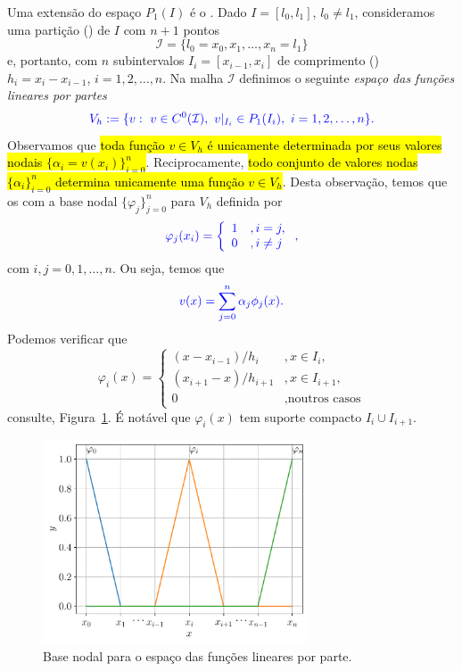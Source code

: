 Uma extensão do espaço $P_1(I)$ é o . Dado $I = [l_0, l_1]$, $l_0\neq l_1$, consideramos uma partição () de $I$ com $n+1$ pontos
\begin{equation}
  \mathcal{I} = \{l_0=x_0, x_1, \dotsc, x_n=l_1\}
\end{equation}
e, portanto, com $n$ subintervalos $I_i=[x_{i-1}, x_{i}]$ de comprimento () $h_i = x_i-x_{i-1}$, $i=1, 2, \dotsc, n$. Na malha $\mathcal{I}$ definimos o seguinte \emph{espaço das funções lineares por partes}
\begin{equation}\color{blue}V_h := \{v:~v\in C^0(\mathcal{I}),~v|_{I_i}\in P_1(I_i),~i=1,2,\dotsc,n\}.
\end{equation}
Observamos que \hl{toda função $v\in V_h$ é unicamente determinada por seus valores nodais $\{\alpha_i = v(x_i)\}_{i=0}^n$}. Reciprocamente, \hl{todo conjunto de valores nodas $\{\alpha_i\}_{i=0}^n$ determina unicamente uma função $v\in V_h$}. Desta observação, temos que os  com a base nodal $\{\varphi_j\}_{j=0}^n$ para $V_h$ definida por
\begin{equation}\color{blue}\varphi_j(x_i) = \left\{
    \begin{array}{ll}
      1 &, i=j,\\
      0 &, i\neq j
    \end{array}
\right.,
\end{equation}
com $i,j=0,1,\dotsc,n$. Ou seja, temos que
\begin{equation}\color{blue}v(x) = \sum_{j=0}^{n}\alpha_j\phi_j(x).
\end{equation}
Podemos verificar que
\begin{equation}
  \varphi_i(x) = \left\{
    \begin{array}{ll}
      (x-x_{i-1})/h_i &, x\in I_i,\\
      (x_{i+1}-x)/h_{i+1} &, x\in I_{i+1},\\
      0 &, \text{noutros casos}
    \end{array}
\right.
\end{equation}
consulte, Figura~\ref{fig:baselinear}. É notável que $\varphi_i(x)$ tem suporte compacto $I_i\cup I_{i+1}$.

\begin{figure}[h!]
  \centering
  \includegraphics[width=0.7\textwidth]{./cap_mef1d/dados/fig_baselinear/fig}
  \caption{Base nodal para o espaço das funções lineares por parte.}
  \label{fig:baselinear}
\end{figure}

